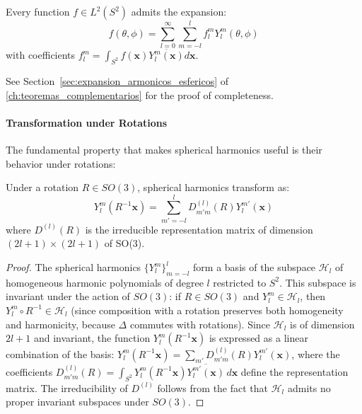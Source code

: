 \begin{theorem}
Every function $f \in L^2(S^2)$ admits the expansion:
\begin{equation}
f(\theta, \phi) = \sum_{l=0}^{\infty} \sum_{m=-l}^{l} f_l^m Y_l^m(\theta, \phi)
\end{equation}
with coefficients $f_l^m = \int_{S^2} f(\mathbf{x}) \overline{Y_l^m(\mathbf{x})} d\mathbf{x}$.

See Section~\ref{sec:expansion_armonicos_esfericos} of \autoref{ch:teoremas_complementarios} for the proof of completeness.
\end{theorem}

\paragraph{Transformation under Rotations}

The fundamental property that makes spherical harmonics useful is their behavior under rotations:

\begin{theorem}
Under a rotation $R \in SO(3)$, spherical harmonics transform as:
\begin{equation}
Y_l^m(R^{-1}\mathbf{x}) = \sum_{m'=-l}^{l} D_{m'm}^{(l)}(R) Y_l^{m'}(\mathbf{x})
\end{equation}
where $D^{(l)}(R)$ is the irreducible representation matrix of dimension $(2l+1) \times (2l+1)$ of SO(3).
\end{theorem}

\begin{proof}
The spherical harmonics $\{Y_l^m\}_{m=-l}^{l}$ form a basis of the subspace $\mathcal{H}_l$ of homogeneous harmonic polynomials of degree $l$ restricted to $S^2$. This subspace is invariant under the action of $SO(3)$: if $R \in SO(3)$ and $Y_l^m \in \mathcal{H}_l$, then $Y_l^m \circ R^{-1} \in \mathcal{H}_l$ (since composition with a rotation preserves both homogeneity and harmonicity, because $\Delta$ commutes with rotations). Since $\mathcal{H}_l$ is of dimension $2l+1$ and invariant, the function $Y_l^m(R^{-1}\mathbf{x})$ is expressed as a linear combination of the basis: $Y_l^m(R^{-1}\mathbf{x}) = \sum_{m'} D_{m'm}^{(l)}(R) Y_l^{m'}(\mathbf{x})$, where the coefficients $D_{m'm}^{(l)}(R) = \int_{S^2} Y_l^m(R^{-1}\mathbf{x}) \overline{Y_l^{m'}(\mathbf{x})} \, d\mathbf{x}$ define the representation matrix. The irreducibility of $D^{(l)}$ follows from the fact that $\mathcal{H}_l$ admits no proper invariant subspaces under $SO(3)$.
\end{proof}

